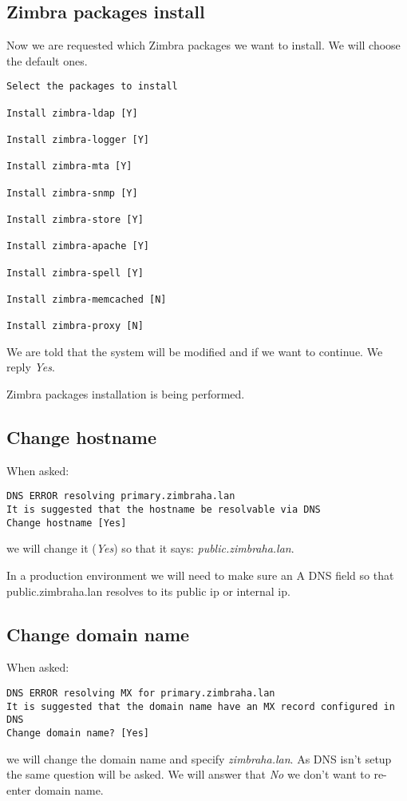 \subsection {\label{subsec:zimbra-packages-install}Zimbra packages install}
Now we are requested which Zimbra packages we want to install. We will choose the default ones.

\begin{verbatim}
Select the packages to install

Install zimbra-ldap [Y] 

Install zimbra-logger [Y] 

Install zimbra-mta [Y] 

Install zimbra-snmp [Y] 

Install zimbra-store [Y] 

Install zimbra-apache [Y] 

Install zimbra-spell [Y] 

Install zimbra-memcached [N] 

Install zimbra-proxy [N] 
\end{verbatim}

We are told that the system will be modified and if we want to continue. We reply \textit{Yes}.

Zimbra packages installation is being performed.

\subsection {Change hostname}
When asked:
\begin{verbatim}
DNS ERROR resolving primary.zimbraha.lan
It is suggested that the hostname be resolvable via DNS
Change hostname [Yes]
\end{verbatim}
we will change it (\textit{Yes}) so that it says: \textit{public.zimbraha.lan}.

In a production environment we will need to make sure an A DNS field so that public.zimbraha.lan resolves to its public ip or internal ip.

\subsection {Change domain name}
When asked:
\begin{verbatim}
DNS ERROR resolving MX for primary.zimbraha.lan
It is suggested that the domain name have an MX record configured in DNS
Change domain name? [Yes] 
\end{verbatim}
we will change the domain name and specify \textit{zimbraha.lan}. As DNS isn't setup the same question will be asked. We will answer that \textit{No} we don't want to re-enter domain name.

